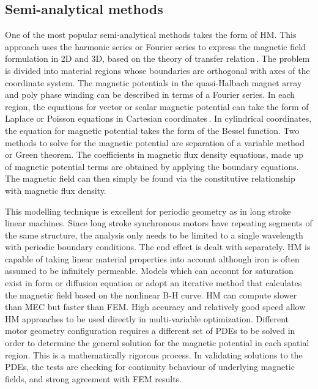         
    \subsection{Semi-analytical methods}            \label{Chapter:background/modelling techniques for designing motors/semi-analytical methods}
    
    
        One of the most popular semi-analytical methods takes the form of \ac{HM}. This approach uses the harmonic series or Fourier series to express the magnetic field formulation in 2D and 3D, based on the theory of transfer relation\,\cite{Melcher1981ContinuumElectromechanics}. The problem is divided into material regions whose boundaries are orthogonal with axes of the coordinate system. The magnetic potentials in the quasi-Halbach magnet array and poly phase winding can be described in terms of a Fourier series. In each region, the equations for vector or scalar magnetic potential can take the form of Laplace or Poisson equations in Cartesian coordinates\,\cite{Trumper1993,Wang1999}. In cylindrical coordinates, the equation for magnetic potential takes the form of the Bessel function\cite{Gysen2008AnalyticalFramework,Ruddy2011a,Gysen20113-DMagnets}. Two methods to solve for the magnetic potential are separation of a variable method or Green theorem. The coefficients in magnetic flux density equations, made up of magnetic potential terms are obtained by applying the boundary equations. The magnetic field can then simply be found via the constitutive relationship with magnetic flux density.
        
        
        This modelling technique is excellent for periodic geometry as in long stroke linear machines. Since long stroke synchronous motors have repeating segments of the same structure, the analysis only needs to be limited to a single wavelength with periodic boundary conditions. The end effect is dealt with separately. \acs{HM} is capable of taking linear material properties into account although iron is often assumed to be infinitely permeable. Models which can account for saturation exist in form or diffusion equation or adopt an iterative method that calculates the magnetic field based on the nonlinear B-H curve. \acs{HM} can compute slower than \acs{MEC} but faster than \acs{FEM}. High accuracy and relatively good speed allow HM approaches to be used directly in multi-variable optimization. Different motor geometry configuration requires a different set of \acsp{PDE} to be solved in order to determine the general solution for the magnetic potential in each spatial region. This is a mathematically rigorous process. In validating solutions to the \acsp{PDE}, the tests are checking for continuity behaviour of underlying magnetic fields, and strong agreement with \acs{FEM} results.
        
